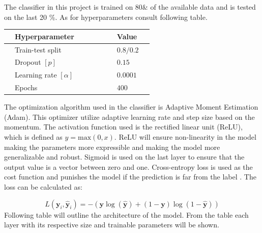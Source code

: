 \documentclass[12pt, fleqn, titlepage]{article}
\newcommand{\1}[1]{\mathds{1}\left[#1\right]}
\begin{document}
	The classifier in this project is trained on 80\& of the available data and is tested on the last 20 \%. As for hyperparameters consult following table.
	
	\begin{table}[H]\label{hyperparams}
		\centering
		\begin{tabular}{l l l l l l l l l}
			\toprule
			& \textbf{Hyperparameter}           &&&&& & \textbf{Value}    & \\ \midrule
			& Train-test split         &&&&& & $0.8/0.2$& \\
			& Dropout $[p]$            &&&&& & $0.15$    & \\ 
			& Learning rate $[\alpha]$ &&&&& & $0.0001$  & \\ 
			& Epochs                   &&&&& & $400$    & \\  \bottomrule
		\end{tabular}
	\end{table}
	
	
	 The optimization algorithm used in the classifier is Adaptive Moment Estimation (Adam). This optimizer utilize adaptive learning rate and step size based on the momentum. The activation function used is the rectified linear unit (ReLU), which is defined as $ y = \text{max}(0,x) $. ReLU will ensure non-linearity in the model making the parameters more expressible and making the model more generalizable and robust. Sigmoid is used on the last layer to ensure that the output value is a vector between zero and one. Cross-entropy loss is used as the cost function and punishes the model if the prediction is far from the label \cite {dl}. The loss can be calculated as:
	 
	\begin{equation*}\label{key}
		L\left(\boldsymbol{y}_{i}, \hat{\boldsymbol{y}}_{i}\right) = -(\mathbf y \log (\mathbf {\hat y})+(1-\mathbf  y) \log (1-\mathbf {\hat y}))
	\end{equation*}
	\noindent
	Following table will outline the architecture of the model. From the table each layer with its respective size and trainable parameters will be shown.
	
\end{document}
